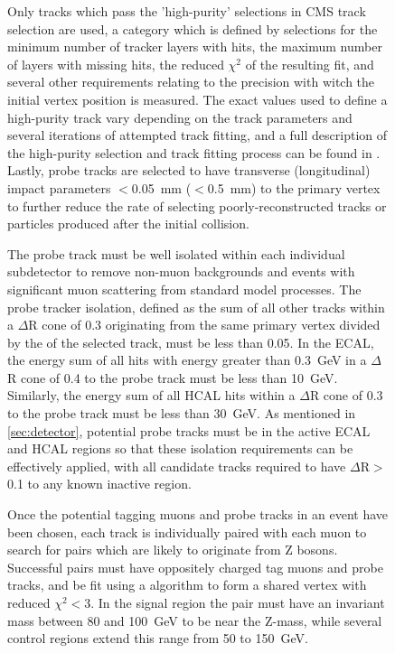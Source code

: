 \begin{figure}[htpb]
Only tracks which pass the 'high-purity' selections in CMS track selection are used, a category which is defined by selections for the minimum number of tracker layers with hits, the maximum number of layers with missing hits, the reduced $\chi^2$ of the resulting fit, and several other requirements relating to the precision with witch the initial vertex position is measured.
The exact values used to define a high-purity track vary depending on the track parameters and several iterations of attempted track fitting, and a full description of the high-purity selection and track fitting process can be found in \cite{trackFitting}.
Lastly, probe tracks are selected to have transverse (longitudinal) impact parameters $<$\SI{0.05}{\milli\meter} ($<$\SI{0.5}{\milli\meter}) to the primary vertex to further reduce the rate of selecting poorly-reconstructed tracks or particles produced after the initial collision.

The probe track must be well isolated within each individual subdetector to remove non-muon backgrounds and events with significant muon scattering from standard model processes. 
The probe tracker isolation, defined as the \pt sum of all other tracks within a $\Delta$R cone of 0.3 originating from the same primary vertex divided by the \pt of the selected track, must be less than 0.05.
In the ECAL, the energy sum of all hits with energy greater than \SI{0.3}{\giga\eV} in a $\Delta$R cone of 0.4 to the probe track must be less than \SI{10}{\giga\eV}.
Similarly, the energy sum of all HCAL hits within a $\Delta$R cone of 0.3 to the probe track must be less than \SI{30}{\giga\eV}. 
As mentioned in \cref{sec:detector}, potential probe tracks must be in the active ECAL and HCAL regions so that these isolation requirements can be effectively applied, with all candidate tracks required to have $\Delta$R$>$0.1 to any known inactive region.

Once the potential tagging muons and probe tracks in an event have been chosen, each track is individually paired with each muon to search for pairs which are likely to originate from Z bosons.
Successful pairs must have oppositely charged tag muons and probe tracks, and be fit using a \kf algorithm to form a shared vertex with reduced $\chi^2<$3.
In the signal region the pair must have an invariant mass between 80 and \SI{100}{\giga\eV} to be near the Z-mass, while several control regions extend this range from 50 to \SI{150}{\giga\eV}.


\end{figure}
